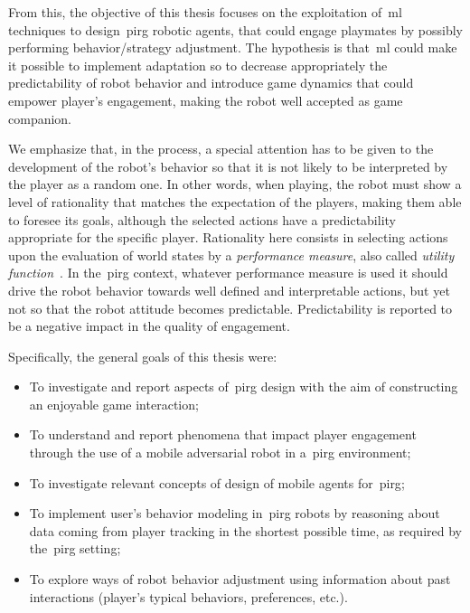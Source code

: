 From this, the objective of this thesis focuses on the exploitation of~\gls{ml} techniques to design~\gls{pirg} robotic agents, that could engage playmates by possibly performing behavior/strategy adjustment. The hypothesis is that~\gls{ml} could make it possible to implement adaptation so to decrease appropriately the predictability of robot behavior and introduce game dynamics that could empower player’s engagement, making the robot well accepted as game companion.

We emphasize that, in the process, a special attention has to be given to the development of the robot's behavior so that it is not likely to be interpreted by the player as a random one. In other words, when playing, the robot must show a level of rationality that matches the expectation of the players, making them able to foresee its goals, although the selected actions have a predictability appropriate for the specific player. Rationality here consists in selecting actions upon the evaluation of world states %
by a \textit{performance measure}, also called \textit{utility function}~\citep{russell_artificial_2009}. In the~\gls{pirg} context, whatever performance measure is used it should drive the robot behavior towards well defined and interpretable actions, but yet not so that the robot attitude becomes predictable. Predictability is reported to be a negative impact in the quality of engagement.   

Specifically, the general goals of this thesis were:

\begin{itemize}
\item To investigate and report aspects of~\gls{pirg} design with the aim of constructing an enjoyable game interaction; 
\item To understand and report phenomena that impact player engagement through the use of a mobile adversarial robot in a~\gls{pirg} environment;
\item To investigate relevant concepts of design of mobile agents for~\gls{pirg};
\item To implement user's behavior modeling in~\gls{pirg} robots by reasoning about data coming from player tracking in the shortest possible time, as required by the~\gls{pirg} setting;
\item To explore ways of robot behavior adjustment using information about past interactions (player's typical behaviors, preferences, etc.).
\end{itemize}

